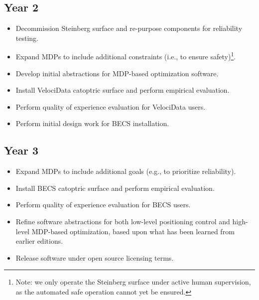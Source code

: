 \subsection*{Year 2}

\begin{itemize}

\item Decommission Steinberg surface and re-purpose components for
reliability testing.

\item Expand MDPs to include additional constraints (i.e., to ensure
safety)\footnote{Note: we only operate the Steinberg surface under active human
supervision, as the automated safe operation cannot yet be ensured.}.

\item Develop initial abstractions for MDP-based optimization software.

\item Install VelociData catoptric surface and perform empirical evaluation.

\item Perform quality of experience evaluation for VelociData users.

\item Perform initial design work for BECS installation.

\end{itemize}

\subsection*{Year 3}

\begin{itemize}

\item Expand MDPs to include additional goals (e.g., to prioritize
reliability).

\item Install BECS catoptric surface and perform empirical evaluation.

\item Perform quality of experience evaluation for BECS users.

\item Refine software abstractions for both low-level positioning control
and high-level MDP-based optimization, based upon what has been learned
from earlier editions.

\item Release software under open source licensing terms.

\end{itemize}
